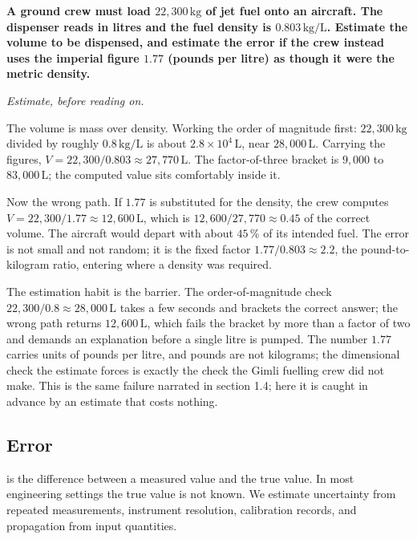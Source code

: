 \begin{estimation}
\textbf{A ground crew must load $22{,}300 \,\si{\kilogram}$ of jet fuel
onto an aircraft. The dispenser reads in litres and the fuel density is
$0.803 \,\si{\kilogram\per\liter}$. Estimate the volume to be
dispensed, and estimate the error if the crew instead uses the
imperial figure $1.77$ (pounds per litre) as though it were the metric
density.}

\smallskip
\textit{Estimate, before reading on.}

\smallskip
The volume is mass over density. Working the order of magnitude first:
$22{,}300 \,\si{\kilogram}$ divided by roughly $0.8 \,\si{\kilogram\per
\liter}$ is about $2.8 \times 10^4 \,\si{\liter}$, near
$28{,}000 \,\si{\liter}$. Carrying the figures,
$V = 22{,}300 / 0.803 \approx 27{,}770 \,\si{\liter}$. The
factor-of-three bracket is $9{,}000$ to $83{,}000 \,\si{\liter}$; the
computed value sits comfortably inside it.

Now the wrong path. If $1.77$ is substituted for the density, the
crew computes $V = 22{,}300 / 1.77 \approx 12{,}600 \,\si{\liter}$,
which is $12{,}600 / 27{,}770 \approx 0.45$ of the correct volume. The
aircraft would depart with about $45\,\%$ of its intended fuel. The
error is not small and not random; it is the fixed factor
$1.77 / 0.803 \approx 2.2$, the pound-to-kilogram ratio, entering
where a density was required.

The estimation habit is the barrier. The order-of-magnitude check
$22{,}300 / 0.8 \approx 28{,}000 \,\si{\liter}$ takes a few seconds and
brackets the correct answer; the wrong path returns
$12{,}600 \,\si{\liter}$, which fails the bracket by more than a factor
of two and demands an explanation before a single litre is pumped. The
number $1.77$ carries units of pounds per litre, and pounds are not
kilograms; the dimensional check the estimate forces is exactly the
check the Gimli fuelling crew did not make. This is the same failure
narrated in section 1.4; here it is caught in advance by an estimate
that costs nothing.
\end{estimation}

\subsection{Error}

 is the difference between a measured value and the
true value. In most engineering settings the true value is not known.
We estimate uncertainty from repeated measurements, instrument
resolution, calibration records, and propagation from input
quantities.

